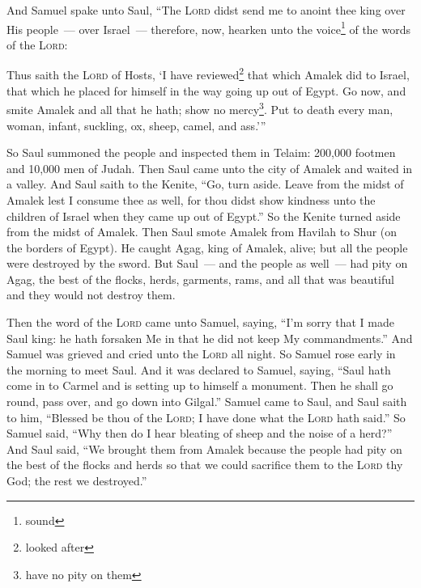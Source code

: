 
\begin{inparaenum}
     And Samuel spake unto Saul, ``The \textsc{Lord} didst send me to anoint thee king over His people~--- over Israel~--- therefore, now, hearken unto the voice\footnote{sound} of the words of the \textsc{Lord}:%
    
     Thus saith the \textsc{Lord} of Hosts, `I have reviewed\footnote{looked after} that which Amalek did to Israel, that which he placed for himself in the way going up out of Egypt.%
     Go now, and smite Amalek and all that he hath; show no mercy\footnote{have no pity on them}. Put to death every man, woman, infant, suckling, ox, sheep, camel, and ass.'''%
    
     So Saul summoned the people and inspected them in Telaim: 200,000 footmen and 10,000 men of Judah.%
     Then Saul came unto the city of Amalek and waited in a valley.%
     And Saul saith to the Kenite, ``Go, turn aside. Leave from the midst of Amalek lest I consume thee as well, for thou didst show kindness unto the children of Israel when they came up out of Egypt.'' So the Kenite turned aside from the midst of Amalek.%
     Then Saul smote Amalek from Havilah to Shur (on the borders of Egypt).%
     He caught Agag, king of Amalek, alive; but all the people were destroyed by the sword.%
     But Saul~--- and the people as well~--- had pity on Agag, the best of the flocks, herds, garments, rams, and all that was beautiful and they would not destroy them.%
    
     Then the word of the \textsc{Lord} came unto Samuel, saying,%
     ``I'm sorry that I made Saul king: he hath forsaken Me in that he did not keep My commandments.'' And Samuel was grieved and cried unto the \textsc{Lord} all night.%
     So Samuel rose early in the morning to meet Saul. And it was declared to Samuel, saying, ``Saul hath come in to Carmel and is setting up to himself a monument. Then he shall go round, pass over, and go down into Gilgal.''%
     Samuel came to Saul, and Saul saith to him, ``Blessed be thou of the \textsc{Lord}; I have done what the \textsc{Lord} hath said.''%
     So Samuel said, ``Why then do I hear bleating of sheep and the noise of a herd?''%
     And Saul said, ``We brought them from Amalek because the people had pity on the best of the flocks and herds so that we could sacrifice them to the \textsc{Lord} thy God; the rest we destroyed.''%
    

\end{inparaenum}
